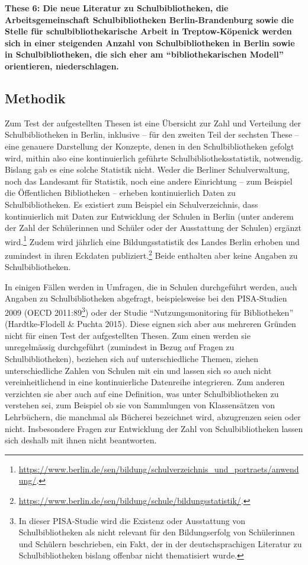 \documentclass[a4paper,
fontsize=11pt,
oneside,
numbers=noperiodatend,
parskip=half-,
bibliography=totoc,
final
]{scrartcl}
\begin{document}
\textbf{These 6: Die neue Literatur zu Schulbibliotheken, die
Arbeitsgemeinschaft Schulbibliotheken Berlin-Brandenburg sowie die
Stelle für schulbibliothekarische Arbeit in Treptow-Köpenick werden sich
in einer steigenden Anzahl von Schulbibliotheken in Berlin sowie in
Schulbibliotheken, die sich eher am \enquote{bibliothekarischen Modell}
orientieren, niederschlagen.}

\subsection{Methodik}\label{methodik}

Zum Test der aufgestellten Thesen ist eine Übersicht zur Zahl und
Verteilung der Schulbibliotheken in Berlin, inklusive -- für den zweiten
Teil der sechsten These -- eine genauere Darstellung der Konzepte, denen
in den Schulbibliotheken gefolgt wird, mithin also eine kontinuierlich
geführte Schulbibliotheksstatistik, notwendig. Bislang gab es eine
solche Statistik nicht. Weder die Berliner Schulverwaltung, noch das
Landesamt für Statistik, noch eine andere Einrichtung -- zum Beispiel
die Öffentlichen Bibliotheken -- erheben kontinuierlich Daten zu
Schulbibliotheken. Es existiert zum Beispiel ein Schulverzeichnis, dass
kontinuierlich mit Daten zur Entwicklung der Schulen in Berlin (unter
anderem der Zahl der Schülerinnen und Schüler oder der Ausstattung der
Schulen) ergänzt wird.\footnote{\url{https://www.berlin.de/sen/bildung/schulverzeichnis_und_portraets/anwendung/}.}
Zudem wird jährlich eine Bildungsstatistik des Landes Berlin erhoben und
zumindest in ihren Eckdaten publiziert.\footnote{\url{https://www.berlin.de/sen/bildung/schule/bildungsstatistik/}.}
Beide enthalten aber keine Angaben zu Schulbibliotheken.

In einigen Fällen werden in Umfragen, die in Schulen durchgeführt
werden, auch Angaben zu Schulbibliotheken abgefragt, beispielsweise bei
den PISA-Studien 2009 (OECD 2011:89\footnote{In dieser PISA-Studie wird
  die Existenz oder Ausstattung von Schulbibliotheken als nicht relevant
  für den Bildungserfolg von Schülerinnen und Schülern beschrieben, ein
  Fakt, der in der deutschsprachigen Literatur zu Schulbibliotheken
  bislang offenbar nicht thematisiert wurde.}) oder der Studie
\enquote{Nutzungsmonitoring für Bibliotheken} (Hardtke-Flodell \& Puchta
2015). Diese eignen sich aber aus mehreren Gründen nicht für einen Test
der aufgestellten Thesen. Zum einen werden sie unregelmässig
durchgeführt (zumindest in Bezug auf Fragen zu Schulbibliotheken),
beziehen sich auf unterschiedliche Themen, ziehen unterschiedliche
Zahlen von Schulen mit ein und lassen sich so auch nicht
vereinheitlichend in eine kontinuierliche Datenreihe integrieren. Zum
anderen verzichten sie aber auch auf eine Definition, was unter
Schulbibliotheken zu verstehen sei, zum Beispiel ob sie von Sammlungen
von Klassensätzen von Lehrbüchern, die manchmal als Bücherei bezeichnet
wird, abzugrenzen seien oder nicht. Insbesondere Fragen zur Entwicklung
der Zahl von Schulbibliotheken lassen sich deshalb mit ihnen nicht
beantworten.
\end{document}
